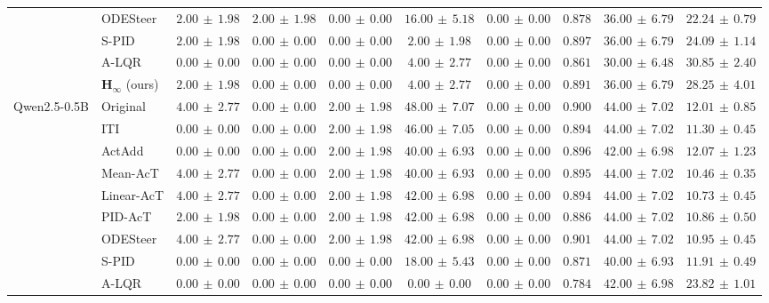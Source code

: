 \begin{table}[!htbp]
{\begin{tabular}{llccccc|ccc}
 & ODESteer & $2.00\,\pm\,1.98$ & $2.00\,\pm\,1.98$ & $0.00\,\pm\,0.00$ & $16.00\,\pm\,5.18$ & $0.00\,\pm\,0.00$ & $0.878$ & $36.00\,\pm\,6.79$ & $22.24\,\pm\,0.79$\\
 & S-PID & $2.00\,\pm\,1.98$ & $0.00\,\pm\,0.00$ & $0.00\,\pm\,0.00$ & $2.00\,\pm\,1.98$ & $0.00\,\pm\,0.00$ & $0.897$ & $36.00\,\pm\,6.79$ & $24.09\,\pm\,1.14$\\
 & A-LQR & $0.00\,\pm\,0.00$ & $0.00\,\pm\,0.00$ & $0.00\,\pm\,0.00$ & $4.00\,\pm\,2.77$ & $0.00\,\pm\,0.00$ & $0.861$ & $30.00\,\pm\,6.48$ & $30.85\,\pm\,2.40$\\
 & $\boldsymbol{H_\infty}$ (ours) & $2.00\,\pm\,1.98$ & $0.00\,\pm\,0.00$ & $0.00\,\pm\,0.00$ & $4.00\,\pm\,2.77$ & $0.00\,\pm\,0.00$ & $0.891$ & $36.00\,\pm\,6.79$ & $28.25\,\pm\,4.01$\\
\midrule
\multirow{10}{*}{Qwen2.5-0.5B} & Original & $4.00\,\pm\,2.77$ & $0.00\,\pm\,0.00$ & $2.00\,\pm\,1.98$ & $48.00\,\pm\,7.07$ & $0.00\,\pm\,0.00$ & $0.900$ & $44.00\,\pm\,7.02$ & $12.01\,\pm\,0.85$\\
 & ITI & $0.00\,\pm\,0.00$ & $0.00\,\pm\,0.00$ & $2.00\,\pm\,1.98$ & $46.00\,\pm\,7.05$ & $0.00\,\pm\,0.00$ & $0.894$ & $44.00\,\pm\,7.02$ & $11.30\,\pm\,0.45$\\
 & ActAdd & $0.00\,\pm\,0.00$ & $0.00\,\pm\,0.00$ & $2.00\,\pm\,1.98$ & $40.00\,\pm\,6.93$ & $0.00\,\pm\,0.00$ & $0.896$ & $42.00\,\pm\,6.98$ & $12.07\,\pm\,1.23$\\
 & Mean-AcT & $4.00\,\pm\,2.77$ & $0.00\,\pm\,0.00$ & $2.00\,\pm\,1.98$ & $40.00\,\pm\,6.93$ & $0.00\,\pm\,0.00$ & $0.895$ & $44.00\,\pm\,7.02$ & $10.46\,\pm\,0.35$\\
 & Linear-AcT & $4.00\,\pm\,2.77$ & $0.00\,\pm\,0.00$ & $2.00\,\pm\,1.98$ & $42.00\,\pm\,6.98$ & $0.00\,\pm\,0.00$ & $0.894$ & $44.00\,\pm\,7.02$ & $10.73\,\pm\,0.45$\\
 & PID-AcT & $2.00\,\pm\,1.98$ & $0.00\,\pm\,0.00$ & $2.00\,\pm\,1.98$ & $42.00\,\pm\,6.98$ & $0.00\,\pm\,0.00$ & $0.886$ & $44.00\,\pm\,7.02$ & $10.86\,\pm\,0.50$\\
 & ODESteer & $4.00\,\pm\,2.77$ & $0.00\,\pm\,0.00$ & $2.00\,\pm\,1.98$ & $42.00\,\pm\,6.98$ & $0.00\,\pm\,0.00$ & $0.901$ & $44.00\,\pm\,7.02$ & $10.95\,\pm\,0.45$\\
 & S-PID & $0.00\,\pm\,0.00$ & $0.00\,\pm\,0.00$ & $0.00\,\pm\,0.00$ & $18.00\,\pm\,5.43$ & $0.00\,\pm\,0.00$ & $0.871$ & $40.00\,\pm\,6.93$ & $11.91\,\pm\,0.49$\\
 & A-LQR & $0.00\,\pm\,0.00$ & $0.00\,\pm\,0.00$ & $0.00\,\pm\,0.00$ & $0.00\,\pm\,0.00$ & $0.00\,\pm\,0.00$ & $0.784$ & $42.00\,\pm\,6.98$ & $23.82\,\pm\,1.01$\\

\end{tabular}}
\end{table}
